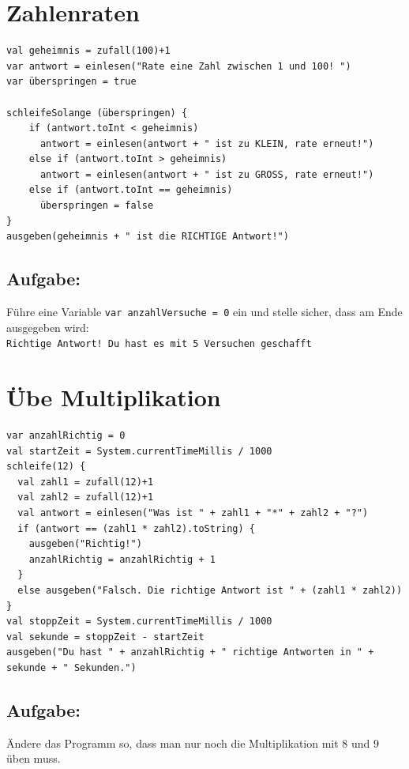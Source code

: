 \chapter{Zahlenraten}
\begin{lstlisting}[basicstyle={\ttfamily\fontsize{16}{19}\selectfont},numbers=none]
val geheimnis = zufall(100)+1
var antwort = einlesen("Rate eine Zahl zwischen 1 und 100! ")
var überspringen = true

schleifeSolange (überspringen) {
    if (antwort.toInt < geheimnis)
      antwort = einlesen(antwort + " ist zu KLEIN, rate erneut!")
    else if (antwort.toInt > geheimnis)
      antwort = einlesen(antwort + " ist zu GROSS, rate erneut!")
    else if (antwort.toInt == geheimnis)
      überspringen = false
}
ausgeben(geheimnis + " ist die RICHTIGE Antwort!")
\end{lstlisting}
        
\section*{\color{BrickRed}Aufgabe:}
Führe eine Variable \lstinline{var anzahlVersuche = 0} ein und stelle sicher, dass am Ende ausgegeben wird:\\
\lstinline{Richtige Antwort! Du hast es mit 5 Versuchen geschafft}
\chapter{Übe Multiplikation}
\begin{lstlisting}[basicstyle={\ttfamily\fontsize{16}{19}\selectfont},numbers=none]
var anzahlRichtig = 0
val startZeit = System.currentTimeMillis / 1000
schleife(12) {
  val zahl1 = zufall(12)+1
  val zahl2 = zufall(12)+1
  val antwort = einlesen("Was ist " + zahl1 + "*" + zahl2 + "?")
  if (antwort == (zahl1 * zahl2).toString) {
    ausgeben("Richtig!")
    anzahlRichtig = anzahlRichtig + 1
  }
  else ausgeben("Falsch. Die richtige Antwort ist " + (zahl1 * zahl2))
}
val stoppZeit = System.currentTimeMillis / 1000
val sekunde = stoppZeit - startZeit
ausgeben("Du hast " + anzahlRichtig + " richtige Antworten in " + sekunde + " Sekunden.")
\end{lstlisting}
        
\section*{\color{BrickRed}Aufgabe:}
Ändere das Programm so, dass man nur noch die Multiplikation mit 8 und 9 üben muss.
